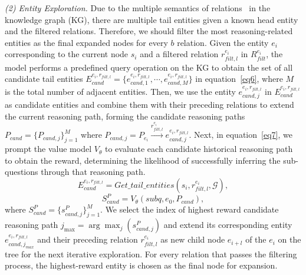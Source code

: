 \documentclass[lettersize,journal]{IEEEtran}
\begin{document}
\textit{(2) Entity Exploration.} Due to the multiple semantics of relations~\cite{lin2015learning, long2024kgdm, long2024fact} in the knowledge graph (KG), there are multiple tail entities given a known head entity and the filtered relations. Therefore, we should filter the most reasoning-related entities as the final expanded nodes for every $b$ relation. Given the entity $e_i$ corresponding to the current node $s_i$ and a filtered relation $r^{e_i}_{filt, l}$ in $R^{e_i}_{filt}$, the model performs a predefined query operation on the KG to obtain the set of all candidate tail entities $E^{e_i, r_{filt, l}}_{cand}=\{ e^{e_i, r_{filt, l}}_{cand, 1}, \cdots, e^{e_i, r_{filt, l}}_{cand, M} \}$ in equation~\ref{eq6}, where $M$ is the total number of adjacent entities. Then, we use the entity $e^{e_i, r_{filt, l}}_{cand, j}$ in $E^{e_i, r_{filt, l}}_{cand}$ as candidate entities and combine them with their preceding relations to extend the current reasoning path, forming the candidate reasoning paths $P_{cand} = \{P_{cand, j} \}^{M}_{j=1}$ where $P_{cand, j} = P_{e_i} \stackrel{r^{e_i}_{filt, l}}{\longrightarrow} e^{e_i, r_{filt, l}}_{cand, j}$. Next, in equation~\ref{eq7}, we prompt the value model $V_\theta$ to evaluate each candidate historical reasoning path to obtain the reward, determining the likelihood of successfully inferring the sub-questions through that reasoning path.
\begin{equation}
    E^{e_i, r_{filt, l}}_{cand} = Get\_tail\_entities(s_{i}, r^{e_i}_{filt, l}, \mathcal{G}),
    \label{eq6}
\end{equation}
\begin{equation}
    S^{P}_{cand} = V_{\theta}(subq, e_0, P_{cand}),
    \label{eq7}
\end{equation}
where $S^{P}_{cand}=\{ s^{P}_{cand, j} \}^{M}_{j=1}$. We select the index of highest reward candidate reasoning path $j_{\text{max}} = \arg\max_{j}(s^{P}_{cand, j})$ and extend its corresponding entity $e^{e_i, r_{filt, l}}_{cand, j_{max}}$ and their preceding relation $r^{e_i}_{filt, l}$ as new child node $e_{i+l}$ of the $e_i$ on the tree for the next iterative exploration. For every relation that passes the filtering process, the highest-reward entity is chosen as the final node for expansion.
\end{document}
